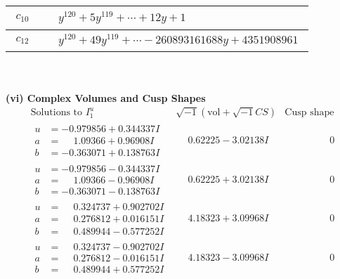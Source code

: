 \documentclass[1p]{elsarticle_modified}
\theoremstyle{definition}
\newcommand{\I}{\sqrt{-1}}
\begin{document}
\begin{tabular}{m{50pt}|m{274pt}}
\hline $$\begin{aligned}c_{10}\end{aligned}$$&$\begin{aligned}
&y^{120}+5 y^{119}+\cdots+12 y+1
\end{aligned}$\\
\hline $$\begin{aligned}c_{12}\end{aligned}$$&$\begin{aligned}
&y^{120}+49 y^{119}+\cdots-260893161688 y+4351908961
\end{aligned}$\\
\hline
\end{tabular}\\~\\
\newpage\flushleft \textbf{(vi) Complex Volumes and Cusp Shapes}
$$\begin{array}{c|c|c}  
\text{Solutions to }I^u_{1}& \I (\text{vol} + \sqrt{-1}CS) & \text{Cusp shape}\\
 \hline 
\begin{aligned}
u &= -0.979856 + 0.344337 I \\
a &= \phantom{-}1.09366 + 0.96908 I \\
b &= -0.363071 + 0.138763 I\end{aligned}
 & \phantom{-}0.62225 - 3.02138 I & \phantom{-0.000000 } 0 \\ \hline\begin{aligned}
u &= -0.979856 - 0.344337 I \\
a &= \phantom{-}1.09366 - 0.96908 I \\
b &= -0.363071 - 0.138763 I\end{aligned}
 & \phantom{-}0.62225 + 3.02138 I & \phantom{-0.000000 } 0 \\ \hline\begin{aligned}
u &= \phantom{-}0.324737 + 0.902702 I \\
a &= \phantom{-}0.276812 + 0.016151 I \\
b &= \phantom{-}0.489944 - 0.577252 I\end{aligned}
 & \phantom{-}4.18323 + 3.09968 I & \phantom{-0.000000 } 0 \\ \hline\begin{aligned}
u &= \phantom{-}0.324737 - 0.902702 I \\
a &= \phantom{-}0.276812 - 0.016151 I \\
b &= \phantom{-}0.489944 + 0.577252 I\end{aligned}
 & \phantom{-}4.18323 - 3.09968 I & \phantom{-0.000000 } 0 \\ \hline\begin{aligned}

\end{aligned}
\end{array}$$
\end{document}
